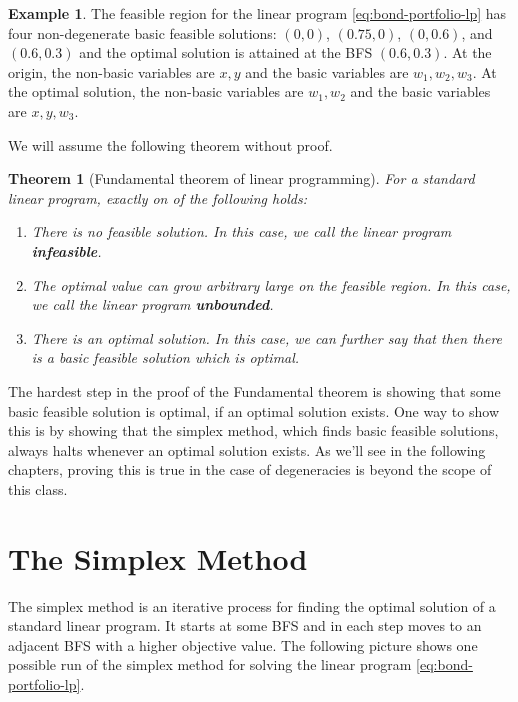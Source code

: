 \documentclass[
]{book}
\providecommand{\tightlist}{%
  \setlength{\itemsep}{0pt}\setlength{\parskip}{0pt}}
\newtheorem{theorem}{Theorem}[chapter]
\theoremstyle{definition}
\theoremstyle{definition}
\newtheorem{example}{Example}[chapter]
\theoremstyle{definition}
\theoremstyle{definition}
\theoremstyle{remark}
\begin{document}
\begin{example}
The feasible region for the linear program \eqref{eq:bond-portfolio-lp} has four non-degenerate basic feasible solutions: \((0,0)\), \((0.75, 0)\), \((0, 0.6)\), and \((0.6, 0.3)\) and the optimal solution is attained at the BFS \((0.6, 0.3)\). At the origin, the non-basic variables are \(x, y\) and the basic variables are \(w_1, w_2, w_3\). At the optimal solution, the non-basic variables are \(w_1, w_2\) and the basic variables are \(x, y, w_3\).
\end{example}

We will assume the following theorem without proof.

\begin{theorem}[Fundamental theorem of linear programming]

For a standard linear program, exactly on of the following holds:

\begin{enumerate}
\def\labelenumi{\arabic{enumi}.}
\tightlist
\item
  There is no feasible solution. In this case, we call the linear program \textbf{infeasible}.
\item
  The optimal value can grow arbitrary large on the feasible region. In this case, we call the linear program \textbf{unbounded}.
\item
  There is an optimal solution. In this case, we can further say that then there is a basic feasible solution which is optimal.
\end{enumerate}

\end{theorem}

The hardest step in the proof of the Fundamental theorem is showing that some basic feasible solution is optimal, if an optimal solution exists. One way to show this is by showing that the simplex method, which finds basic feasible solutions, always halts whenever an optimal solution exists. As we'll see in the following chapters, proving this is true in the case of degeneracies is beyond the scope of this class.

\hypertarget{the-simplex-method}{%
\chapter{The Simplex Method}\label{the-simplex-method}}

The simplex method is an iterative process for finding the optimal solution of a standard linear program. It starts at some BFS and in each step moves to an adjacent BFS with a higher objective value. The following picture shows one possible run of the simplex method for solving the linear program \eqref{eq:bond-portfolio-lp}.
\end{document}
